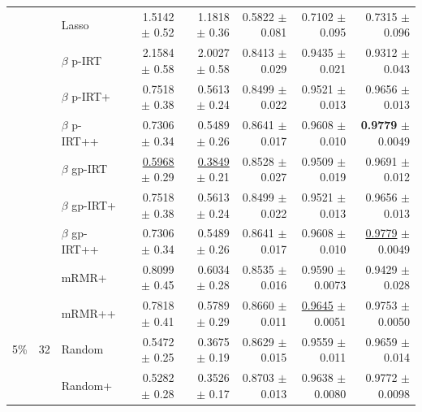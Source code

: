 \begin{longtable}{llp{}rrrrr}
 &  & Lasso & 1.5142 {\scriptsize $\pm$ 0.52} & 1.1818 {\scriptsize $\pm$ 0.36} & 0.5822 {\scriptsize $\pm$ 0.081} & 0.7102 {\scriptsize $\pm$ 0.095} & 0.7315 {\scriptsize $\pm$ 0.096} \\
 &  & $\beta$ p-IRT & 2.1584 {\scriptsize $\pm$ 0.58} & 2.0027 {\scriptsize $\pm$ 0.58} & 0.8413 {\scriptsize $\pm$ 0.029} & 0.9435 {\scriptsize $\pm$ 0.021} & 0.9312 {\scriptsize $\pm$ 0.043} \\
 &  & $\beta$ p-IRT+ & 0.7518 {\scriptsize $\pm$ 0.38} & 0.5613 {\scriptsize $\pm$ 0.24} & 0.8499 {\scriptsize $\pm$ 0.022} & 0.9521 {\scriptsize $\pm$ 0.013} & 0.9656 {\scriptsize $\pm$ 0.013} \\
 &  & $\beta$ p-IRT++ & 0.7306 {\scriptsize $\pm$ 0.34} & 0.5489 {\scriptsize $\pm$ 0.26} & 0.8641 {\scriptsize $\pm$ 0.017} & 0.9608 {\scriptsize $\pm$ 0.010} & \textbf{0.9779} {\scriptsize $\pm$ 0.0049} \\
 &  & $\beta$ gp-IRT & \underline{0.5968} {\scriptsize $\pm$ 0.29} & \underline{0.3849} {\scriptsize $\pm$ 0.21} & 0.8528 {\scriptsize $\pm$ 0.027} & 0.9509 {\scriptsize $\pm$ 0.019} & 0.9691 {\scriptsize $\pm$ 0.012} \\
 &  & $\beta$ gp-IRT+ & 0.7518 {\scriptsize $\pm$ 0.38} & 0.5613 {\scriptsize $\pm$ 0.24} & 0.8499 {\scriptsize $\pm$ 0.022} & 0.9521 {\scriptsize $\pm$ 0.013} & 0.9656 {\scriptsize $\pm$ 0.013} \\
 &  & $\beta$ gp-IRT++ & 0.7306 {\scriptsize $\pm$ 0.34} & 0.5489 {\scriptsize $\pm$ 0.26} & 0.8641 {\scriptsize $\pm$ 0.017} & 0.9608 {\scriptsize $\pm$ 0.010} & \underline{0.9779} {\scriptsize $\pm$ 0.0049} \\
 &  & mRMR+ & 0.8099 {\scriptsize $\pm$ 0.45} & 0.6034 {\scriptsize $\pm$ 0.28} & 0.8535 {\scriptsize $\pm$ 0.016} & 0.9590 {\scriptsize $\pm$ 0.0073} & 0.9429 {\scriptsize $\pm$ 0.028} \\
 &  & mRMR++ & 0.7818 {\scriptsize $\pm$ 0.41} & 0.5789 {\scriptsize $\pm$ 0.29} & 0.8660 {\scriptsize $\pm$ 0.011} & \underline{0.9645} {\scriptsize $\pm$ 0.0051} & 0.9753 {\scriptsize $\pm$ 0.0050} \\
\midrule
5\% & 32 & Random & 0.5472 {\scriptsize $\pm$ 0.25} & 0.3675 {\scriptsize $\pm$ 0.19} & 0.8629 {\scriptsize $\pm$ 0.015} & 0.9559 {\scriptsize $\pm$ 0.011} & 0.9659 {\scriptsize $\pm$ 0.014} \\
 &  & Random+ & 0.5282 {\scriptsize $\pm$ 0.28} & 0.3526 {\scriptsize $\pm$ 0.17} & 0.8703 {\scriptsize $\pm$ 0.013} & 0.9638 {\scriptsize $\pm$ 0.0080} & 0.9772 {\scriptsize $\pm$ 0.0098} \\

\end{longtable}
